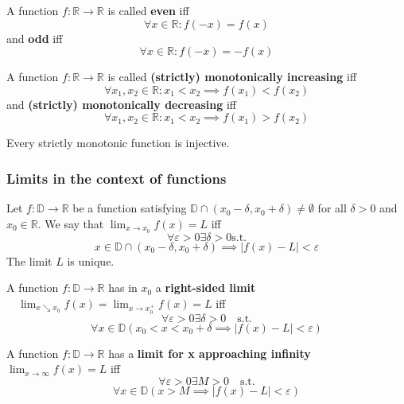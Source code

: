\begin{definition}
    A function $f: \mathbb{R} \to \mathbb{R}$ is called
    \textbf{even} iff 
    $$\forall x \in \mathbb{R} : f(-x) = f(x)$$
    and \textbf{odd} iff 
    $$\forall x \in \mathbb{R} : f(-x) = -f(x)$$
\end{definition}

\begin{definition}
    A function  $f: \mathbb{R} \to \mathbb{R}$ is called \textbf{(strictly) monotonically increasing} iff 
    $$\forall x_1, x_2 \in \mathbb{R} : x_1 < x_2 \implies f(x_1) < f(x_2)$$
    and \textbf{(strictly) monotonically decreasing} iff 
    $$\forall x_1, x_2 \in \mathbb{R} : x_1 < x_2 \implies f(x_1) > f(x_2)$$
\end{definition}

\begin{theorem}
    Every strictly monotonic function is injective.
\end{theorem}


\subsubsection{Limits in the context of functions}

\begin{definition}
    Let $f: \mathbb{D} \to \mathbb{R}$ be a function satisfying $\mathbb{D} \cap (x_0 - \delta, x_0 + \delta) \neq \emptyset$ for all $\delta > 0$ and $x_0 \in \mathbb{R}$. We say that $\lim_{x \to x_0} f(x) = L$ iff 
    $$\forall \varepsilon > 0 \exists \delta > 0  \text{s.t.}$$
    $$x \in \mathbb{D} \cap (x_0 - \delta, x_0 + \delta) \implies |f(x) - L| < \varepsilon$$
    The limit $L$ is unique.
\end{definition}

\begin{definition}
    A function $f: \mathbb{D} \to \mathbb{R}$ has in $x_0$ a
    \textbf{right-sided limit} $\quad \lim_{x \searrow x_0} f(x) = \lim_{x \to x_0^+} f(x) = L$ iff 
    $$\forall \varepsilon > 0 \exists \delta > 0  \quad \text{s.t.}$$
    $$\forall x \in \mathbb{D} (x_0 < x < x_0 + \delta \implies |f(x) - L| < \varepsilon)$$
\end{definition}

\begin{definition}
    A function $f: \mathbb{D} \to \mathbb{R}$ has a \textbf{limit for x approaching infinity} $\lim_{x \to \infty} f(x) = L$ iff 
    $$\forall \varepsilon > 0 \exists M > 0 \quad \text{s.t.}$$
    $$\forall x \in \mathbb{D} (x > M \implies |f(x) - L| < \varepsilon)$$
\end{definition}

